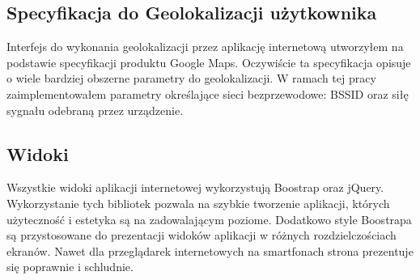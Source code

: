 \subsection{Specyfikacja do Geolokalizacji użytkownika}
Interfejs do wykonania geolokalizacji przez aplikację internetową utworzyłem na podstawie specyfikacji produktu Google Maps.\cite{GoogleMapsGeolocationAPI} Oczywiście ta specyfikacja opisuje o wiele bardziej obszerne parametry do geolokalizacji. W ramach tej pracy zaimplementowałem parametry określające sieci bezprzewodowe: BSSID oraz siłę sygnału odebraną przez urządzenie.

\subsection{Widoki}
Wszystkie widoki aplikacji internetowej wykorzystują Boostrap oraz jQuery. Wykorzystanie tych bibliotek pozwala na szybkie tworzenie aplikacji, których użyteczność i estetyka są na zadowalającym poziome. Dodatkowo style Boostrapa są przystosowane do prezentacji widoków aplikacji w różnych rozdzielczościach ekranów. Nawet dla przeglądarek internetowych na smartfonach strona prezentuje się poprawnie i schludnie.
